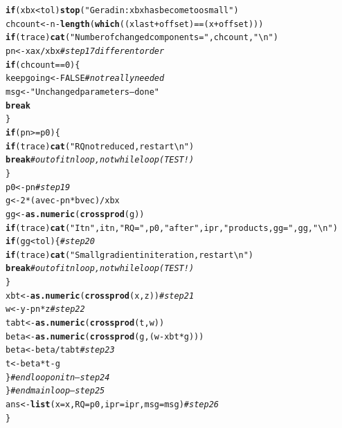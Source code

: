 \documentclass[10pt]{article}\usepackage[]{graphicx}\usepackage[]{color}
\makeatletter
\newcommand{\hlnum}[1]{\textcolor[rgb]{0.686,0.059,0.569}{#1}}%
\newcommand{\hlstr}[1]{\textcolor[rgb]{0.192,0.494,0.8}{#1}}%
\newcommand{\hlcom}[1]{\textcolor[rgb]{0.678,0.584,0.686}{\textit{#1}}}%
\newcommand{\hlopt}[1]{\textcolor[rgb]{0,0,0}{#1}}%
\newcommand{\hlstd}[1]{\textcolor[rgb]{0.345,0.345,0.345}{#1}}%
\newcommand{\hlkwa}[1]{\textcolor[rgb]{0.161,0.373,0.58}{\textbf{#1}}}%
\newcommand{\hlkwb}[1]{\textcolor[rgb]{0.69,0.353,0.396}{#1}}%
\newcommand{\hlkwc}[1]{\textcolor[rgb]{0.333,0.667,0.333}{#1}}%
\newcommand{\hlkwd}[1]{\textcolor[rgb]{0.737,0.353,0.396}{\textbf{#1}}}%
\newenvironment{kframe}{%
 \def\at@end@of@kframe{}%
 \ifinner\ifhmode%
  \def\at@end@of@kframe{\end{minipage}}%
  \begin{minipage}{\columnwidth}%
 \fi\fi%
 \def\FrameCommand##1{\hskip\@totalleftmargin \hskip-\fboxsep
 \colorbox{shadecolor}{##1}\hskip-\fboxsep
     \hskip-\linewidth \hskip-\@totalleftmargin \hskip\columnwidth}%
 \MakeFramed {\advance\hsize-\width
   \@totalleftmargin\z@ \linewidth\hsize
   \@setminipage}}%
 {\par\unskip\endMakeFramed%
 \at@end@of@kframe}
\newenvironment{knitrout}{}{} %
\makeatother
\begin{document}
\begin{knitrout}
\begin{kframe}
\begin{alltt}
       \hlkwa{if} \hlstd{(xbx}\hlopt{<}\hlstd{tol)} \hlkwd{stop}\hlstd{(}\hlstr{"Geradin: xbx has become too small"}\hlstd{)}
       \hlstd{chcount}\hlkwb{<-}\hlstd{n} \hlopt{-} \hlkwd{length}\hlstd{(}\hlkwd{which}\hlstd{((xlast}\hlopt{+}\hlstd{offset)}\hlopt{==}\hlstd{(x}\hlopt{+}\hlstd{offset)))}
       \hlkwa{if} \hlstd{(trace)} \hlkwd{cat}\hlstd{(}\hlstr{"Number of changed components = "}\hlstd{,chcount,}\hlstr{"\textbackslash{}n"}\hlstd{)}
       \hlstd{pn}\hlkwb{<-}\hlstd{xax}\hlopt{/}\hlstd{xbx} \hlcom{# step 17 different order}
       \hlkwa{if} \hlstd{(chcount}\hlopt{==}\hlnum{0}\hlstd{) \{}
         \hlstd{keepgoing}\hlkwb{<-}\hlnum{FALSE} \hlcom{# not really needed}
         \hlstd{msg}\hlkwb{<-}\hlstr{"Unchanged parameters -- done"}
         \hlkwa{break}
       \hlstd{\}}
       \hlkwa{if} \hlstd{(pn} \hlopt{>=} \hlstd{p0) \{}
         \hlkwa{if} \hlstd{(trace)} \hlkwd{cat}\hlstd{(}\hlstr{"RQ not reduced, restart\textbackslash{}n"}\hlstd{)}
         \hlkwa{break} \hlcom{# out of itn loop, not while loop (TEST!)}
       \hlstd{\}}
       \hlstd{p0}\hlkwb{<-}\hlstd{pn} \hlcom{# step 19}
       \hlstd{g}\hlkwb{<-}\hlnum{2}\hlopt{*}\hlstd{(avec}\hlopt{-}\hlstd{pn}\hlopt{*}\hlstd{bvec)}\hlopt{/}\hlstd{xbx}
       \hlstd{gg}\hlkwb{<-}\hlkwd{as.numeric}\hlstd{(}\hlkwd{crossprod}\hlstd{(g))}
       \hlkwa{if} \hlstd{(trace)} \hlkwd{cat}\hlstd{(}\hlstr{"Itn"}\hlstd{, itn,}\hlstr{" RQ="}\hlstd{,p0,}\hlstr{" after "}\hlstd{,ipr,}\hlstr{" products, gg="}\hlstd{,gg,}\hlstr{"\textbackslash{}n"}\hlstd{)}
       \hlkwa{if} \hlstd{(gg}\hlopt{<}\hlstd{tol)\{} \hlcom{# step 20}
         \hlkwa{if} \hlstd{(trace)} \hlkwd{cat}\hlstd{(}\hlstr{"Small gradient in iteration, restart\textbackslash{}n"}\hlstd{)}
         \hlkwa{break} \hlcom{# out of itn loop, not while loop (TEST!)}
       \hlstd{\}}
       \hlstd{xbt}\hlkwb{<-}\hlkwd{as.numeric}\hlstd{(}\hlkwd{crossprod}\hlstd{(x,z))} \hlcom{# step 21}
       \hlstd{w}\hlkwb{<-}\hlstd{y}\hlopt{-}\hlstd{pn}\hlopt{*}\hlstd{z} \hlcom{# step 22}
       \hlstd{tabt}\hlkwb{<-}\hlkwd{as.numeric}\hlstd{(}\hlkwd{crossprod}\hlstd{(t,w))}
       \hlstd{beta}\hlkwb{<-}\hlkwd{as.numeric}\hlstd{(}\hlkwd{crossprod}\hlstd{(g,(w}\hlopt{-}\hlstd{xbt}\hlopt{*}\hlstd{g)))}
       \hlstd{beta}\hlkwb{<-}\hlstd{beta}\hlopt{/}\hlstd{tabt} \hlcom{# step 23}
       \hlstd{t}\hlkwb{<-}\hlstd{beta}\hlopt{*}\hlstd{t}\hlopt{-}\hlstd{g}
    \hlstd{\}} \hlcom{# end loop on itn -- step 24}
  \hlstd{\}} \hlcom{# end main loop -- step 25}
  \hlstd{ans}\hlkwb{<-}\hlkwd{list}\hlstd{(}\hlkwc{x}\hlstd{=x,} \hlkwc{RQ}\hlstd{=p0,} \hlkwc{ipr}\hlstd{=ipr,} \hlkwc{msg}\hlstd{=msg)} \hlcom{# step 26}
\hlstd{\}}
\end{alltt}
\end{kframe}
\end{knitrout}
\end{document}
